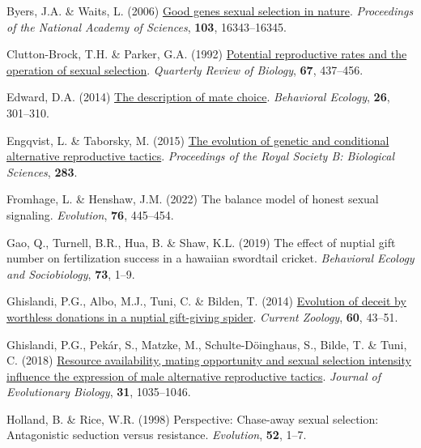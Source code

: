 \documentclass[
]{article}
\newlength{\cslhangindent}
\newlength{\cslentryspacingunit} %
\newenvironment{CSLReferences}[2] %
 {%
  \setlength{\parindent}{0pt}
  \ifodd #1
  \let\oldpar\par
  \def\par{\hangindent=\cslhangindent\oldpar}
  \fi
  \setlength{\parskip}{#2\cslentryspacingunit}
 }%
 {}
\begin{document}
\begin{CSLReferences}{0}{0}
\leavevmode{}%
Byers, J.A. \& Waits, L. (2006)
\href{https://doi.org/10.1073/pnas.0608184103}{{Good genes sexual
selection in nature}}. \emph{Proceedings of the National Academy of
Sciences}, \textbf{103}, 16343--16345.

\leavevmode{}%
Clutton-Brock, T.H. \& Parker, G.A. (1992)
\href{https://doi.org/10.1086/417793}{{Potential reproductive rates and
the operation of sexual selection}}. \emph{Quarterly Review of Biology},
\textbf{67}, 437--456.

\leavevmode{}%
Edward, D.A. (2014) \href{https://doi.org/10.1093/beheco/aru142}{The
description of mate choice}. \emph{Behavioral Ecology}, \textbf{26},
301--310.

\leavevmode{}%
Engqvist, L. \& Taborsky, M. (2015)
\href{https://doi.org/10.1098/rspb.2015.2945}{{The evolution of genetic
and conditional alternative reproductive tactics}}. \emph{Proceedings of
the Royal Society B: Biological Sciences}, \textbf{283}.

\leavevmode{}%
Fromhage, L. \& Henshaw, J.M. (2022) The balance model of honest sexual
signaling. \emph{Evolution}, \textbf{76}, 445--454.

\leavevmode{}%
Gao, Q., Turnell, B.R., Hua, B. \& Shaw, K.L. (2019) The effect of
nuptial gift number on fertilization success in a hawaiian swordtail
cricket. \emph{Behavioral Ecology and Sociobiology}, \textbf{73}, 1--9.

\leavevmode{}%
Ghislandi, P.G., Albo, M.J., Tuni, C. \& Bilden, T. (2014)
\href{https://www.ptonline.com/articles/how-to-get-better-mfi-results}{{Evolution
of deceit by worthless donations in a nuptial gift-giving spider}}.
\emph{Current Zoology}, \textbf{60}, 43--51.

\leavevmode{}%
Ghislandi, P.G., Pekár, S., Matzke, M., Schulte-Döinghaus, S., Bilde, T.
\& Tuni, C. (2018) \href{https://doi.org/10.1111/jeb.13284}{{Resource
availability, mating opportunity and sexual selection intensity
influence the expression of male alternative reproductive tactics}}.
\emph{Journal of Evolutionary Biology}, \textbf{31}, 1035--1046.

\leavevmode{}%
Holland, B. \& Rice, W.R. (1998) Perspective: Chase-away sexual
selection: Antagonistic seduction versus resistance. \emph{Evolution},
\textbf{52}, 1--7.


\end{CSLReferences}
\end{document}
